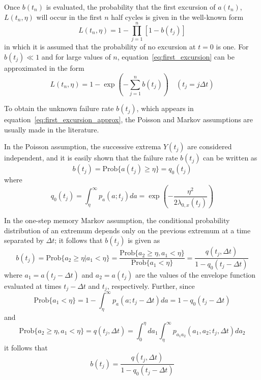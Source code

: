 \documentclass[11pt]{article}
\begin{document}
Once $b(t_n)$ is evaluated, the probability that the first excursion of $a(t_n)$, $L(t_n, \eta)$ will occur in the first $n$ half cycles is given in the well-known form \cite{krenk1979,naess1983,naess1984,preumont1985,yang1971}
\begin{equation}
L(t_n, \eta) = 1 - \prod_{j=1}^{n} [1 - b(t_j)]
\label{eq:first_excursion}
\end{equation}
in which it is assumed that the probability of no excursion at $t = 0$ is one. For $b(t_j) \ll 1$ and for large values of $n$, equation~\eqref{eq:first_excursion} can be approximated in the form \cite{yang1971}
\begin{equation}
L(t_n, \eta) = 1 - \exp\left(-\sum_{j=1}^{n} b(t_j)\right) \quad (t_j = j\Delta t)
\label{eq:first_excursion_approx}
\end{equation}

To obtain the unknown failure rate $b(t_j)$, which appears in equation~\eqref{eq:first_excursion_approx}, the Poisson and Markov assumptions are usually made in the literature.

In the Poisson assumption, the successive extrema $Y(t_j)$ are considered independent, and it is easily shown that the failure rate $b(t_j)$ can be written as
\begin{equation}
b(t_j) = \text{Prob}\{a(t_j) \geq \eta\} = q_0(t_j)
\label{eq:poisson_failure}
\end{equation}
where
\begin{equation}
q_0(t_j) = \int_{\eta}^{\infty} p_a(a; t_j) da = \exp\left(-\frac{\eta^2}{2\lambda_{0,x}(t_j)}\right)
\label{eq:q0}
\end{equation}

In the one-step memory Markov assumption, the conditional probability distribution of an extremum depends only on the previous extremum at a time separated by $\Delta t$; it follows that $b(t_j)$ is given as
\begin{equation}
b(t_j) = \text{Prob}\{a_2 \geq \eta | a_1 < \eta\} = \frac{\text{Prob}\{a_2 \geq \eta, a_1 < \eta\}}{\text{Prob}\{a_1 < \eta\}} = \frac{q(t_j, \Delta t)}{1 - q_0(t_j - \Delta t)}
\label{eq:markov_failure}
\end{equation}
where $a_1 = a(t_j - \Delta t)$ and $a_2 = a(t_j)$ are the values of the envelope function evaluated at times $t_j - \Delta t$ and $t_j$, respectively. Further, since
\begin{equation}
\text{Prob}\{a_1 < \eta\} = 1 - \int_{\eta}^{\infty} p_a(a; t_j - \Delta t) da = 1 - q_0(t_j - \Delta t)
\label{eq:prob_a1}
\end{equation}
and
\begin{equation}
\text{Prob}\{a_2 \geq \eta, a_1 < \eta\} = q(t_j, \Delta t) = \int_0^{\eta} da_1 \int_{\eta}^{\infty} p_{a_1a_2}(a_1, a_2; t_j, \Delta t) da_2
\label{eq:prob_a1a2}
\end{equation}
it follows that
\begin{equation}
b(t_j) = \frac{q(t_j, \Delta t)}{1 - q_0(t_j - \Delta t)}
\label{eq:markov_b}
\end{equation}
\end{document}
